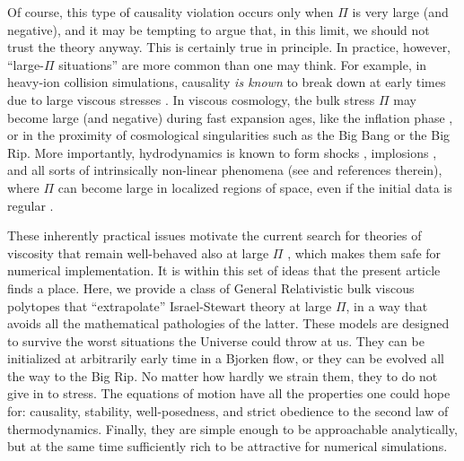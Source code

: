 \documentclass[a4paper, amsfonts, amssymb, amsmath, reprint, showkeys, nofootinbib, twoside,notitlepage,onecolumn]{revtex4-2}
\theoremstyle{definition}
\theoremstyle{theorem}
\theoremstyle{corollary}
\begin{document}
Of course, this type of causality violation occurs only when $\Pi$ is very large (and negative), and it may be tempting to argue that, in this limit, we should not trust the theory anyway. This is certainly true in principle. In practice, however, ``large-$\Pi$ situations'' are more common than one may think. For example, in heavy-ion collision simulations, causality \textit{is known} to break down at early times due to large viscous stresses \cite{Plumberg2022}. In viscous cosmology, the bulk stress $\Pi$ may become large (and negative) during fast expansion ages, like the inflation phase \cite{MaartensInflation:1996dk}, or in the proximity of cosmological singularities such as the Big Bang or the Big Rip. More importantly, hydrodynamics is known to form shocks \cite{christodoulou2017shock}, implosions \cite{MerleImplosion}, and all sorts of intrinsically non-linear phenomena (see \cite{DisconziReview2023rtt} and references therein), where $\Pi$ can become large in localized regions of space, even if the initial data is regular \cite{DisconziBreakdown2020ijk}. 

These inherently practical issues motivate the current search for theories of viscosity that remain well-behaved also at large $\Pi$ \cite{MaartensInflation:1996dk,BemficaDNDefinitivo2020}, which makes them safe for numerical implementation. It is within this set of ideas that the present article finds a place. Here, we provide a class of General Relativistic bulk viscous polytopes that ``extrapolate'' Israel-Stewart theory at large $\Pi$, in a way that avoids all the mathematical pathologies of the latter. These models are designed to survive the worst situations the Universe could throw at us. They can be initialized at arbitrarily early time in a Bjorken flow, or they can be evolved all the way to the Big Rip. No matter how hardly we strain them, they to do not give in to stress. The equations of motion have all the properties one could hope for: causality, stability, well-posedness, and strict obedience to the second law of thermodynamics. Finally, they are simple enough to be approachable analytically, but at the same time sufficiently rich to be attractive for numerical simulations.



\end{document}
